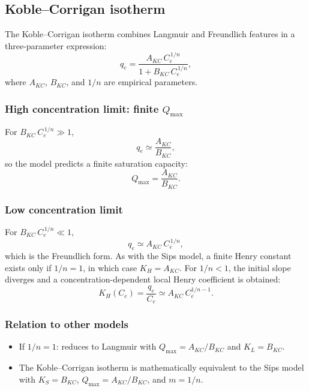 	\subsection{Koble--Corrigan isotherm}

	The Koble--Corrigan isotherm combines Langmuir and Freundlich
	features in a three-parameter expression:
	\begin{equation}
		q_e = \frac{A_{KC}\, C_e^{\,1/n}}{1 + B_{KC}\, C_e^{\,1/n}},
		\label{eq:KobleCorrigan}
	\end{equation}
	where $A_{KC}$, $B_{KC}$, and $1/n$ are empirical parameters.

	\subsubsection{High concentration limit: finite $Q_{\max}$}

	For $B_{KC}\,C_e^{\,1/n} \gg 1$,
	\begin{equation}
		q_e \simeq \frac{A_{KC}}{B_{KC}},
	\end{equation}
	so the model predicts a finite saturation capacity:
	\begin{equation}
		\boxed{Q_{\max} = \frac{A_{KC}}{B_{KC}}.}
	\end{equation}

	\subsubsection{Low concentration limit}

	For $B_{KC}\,C_e^{\,1/n} \ll 1$,
	\begin{equation}
		q_e \simeq A_{KC}\, C_e^{\,1/n},
	\end{equation}
	which is the Freundlich form. As with the Sips model, a finite
	Henry constant exists only if $1/n = 1$, in which case
	$K_H = A_{KC}$.  For $1/n < 1$, the initial slope diverges and
	a concentration-dependent local Henry coefficient is obtained:
	\begin{equation}
		K_H(C_e) = \frac{q_e}{C_e}
		\simeq A_{KC}\, C_e^{1/n - 1}.
	\end{equation}

	\subsubsection{Relation to other models}

	\begin{itemize}
		\item If $1/n = 1$: reduces to Langmuir with
		$Q_{\max} = A_{KC}/B_{KC}$ and $K_L = B_{KC}$.
		\item The Koble--Corrigan isotherm is mathematically equivalent
		to the Sips model with $K_S = B_{KC}$, $Q_{\max} = A_{KC}/B_{KC}$,
		and $m = 1/n$.
	\end{itemize}

